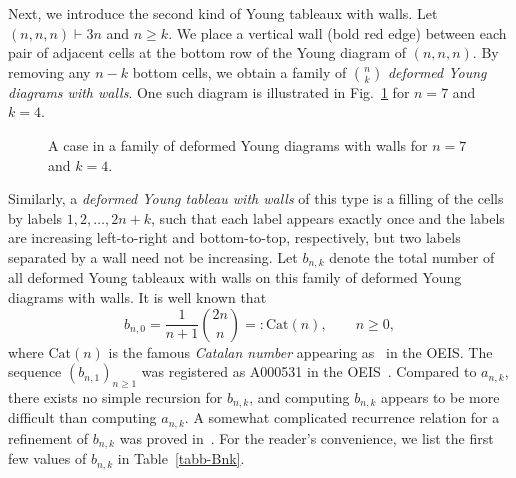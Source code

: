 \documentclass[reqno, 12pt]{article}
\theoremstyle{mydefinition}
\theoremstyle{myremark}
\numberwithin{algorithm}{section}
\begin{document}
Next, we introduce the second kind of Young tableaux with walls. Let $(n,n,n)\vdash 3n$ and $n\geq k$. We place a vertical wall (bold red edge) between each pair of adjacent cells at the bottom row of the Young diagram of $(n,n,n)$.
By removing any $n-k$ bottom cells, we obtain a family of ${n\choose k}$ \emph{deformed Young diagrams with walls}.
One such diagram is illustrated in Fig.~\ref{tab:bnk} for $n=7$ and $k=4$.
\begin{figure}[htbp]
\centering
{}
\caption{A case in a family of deformed Young diagrams with walls for $n=7$ and $k=4$.}
\label{tab:bnk}
\end{figure}
Similarly, a \emph{deformed Young tableau with walls} of this type is a filling of the cells by labels $1,2,\dots, 2n+k$, such that each label appears exactly once and the labels are increasing left-to-right and bottom-to-top, respectively, but two labels separated by a wall need not be increasing.
Let $b_{n,k}$ denote the total number of all deformed Young tableaux with walls on this family of deformed Young diagrams with walls.
It is well known that
\begin{equation}\label{eq:bn0}
b_{n,0}=\frac{1}{n+1}\binom{2n}{n}=:\mathrm{Cat}(n),\qquad n\geq 0,
\end{equation}
where $\mathrm{Cat}(n)$ is the famous {\em Catalan number} appearing as~\cite[A000108]{Sloane23} in the OEIS. The sequence $(b_{n,1})_{n\geq 1}$ was registered as A000531 in the OEIS~\cite{Sloane23}. Compared  to $a_{n,k}$, there exists no simple recursion for $b_{n,k}$, and computing $b_{n,k}$ appears to be more difficult than computing  $a_{n,k}$. A somewhat complicated  recurrence relation for a refinement of $b_{n,k}$ was proved in~\cite[Proposition~3.7]{CFLWY}. For the reader's convenience, we list the first few values of $b_{n,k}$ in Table~\ref{tabb-Bnk}.
\end{document}
